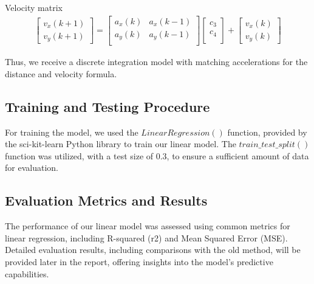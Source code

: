 Velocity matrix
\begin{align}
\label{eq:velocity_matrix}
    \begin{bmatrix}
        v_x(k+1) \\ 
        v_y(k+1) 
    \end{bmatrix}
    =
    \begin{bmatrix}
        a_x(k) & a_x(k-1)    \\ 
        a_y(k) & a_y(k-1)    \\
    \end{bmatrix}
    \begin{bmatrix}
        c_3 \\
        c_4 \\
   \end{bmatrix}
    +
    \begin{bmatrix}
        v_x(k) \\
        v_y(k) 
    \end{bmatrix}
\end{align}

Thus, we receive a discrete integration model with matching accelerations for the distance and velocity formula.

\subsection{Training and Testing Procedure} 
For training the model, we used the $LinearRegression()$ function, provided by the sci-kit-learn Python library to train our linear model.
The $train\_test\_split()$ function was utilized, with a test size of 0.3, to ensure a sufficient amount of data 
for evaluation.

\subsection{Evaluation Metrics and Results} 
The performance of our linear model was assessed using common metrics for linear regression, including 
R-squared (r2) and Mean Squared Error (MSE). 
Detailed evaluation results, including comparisons with the old method, will be provided later in the report, 
offering insights into the model's predictive capabilities.

